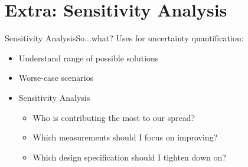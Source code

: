 \documentclass{beamer}
\newcommand{\expv}[1]{\ensuremath{\mathbb{E}[ #1]}}
\begin{document}
%

\section{Extra: Sensitivity Analysis}
\begin{frame}[label=sens_use]{Sensitivity Analysis}{So...what?}\vspace{-20pt}
Uses for uncertainty quantification:\vspace{5pt}
\begin{itemize}
\item Understand range of possible solutions
\item Worse-case scenarios
\item Sensitivity Analysis
  \begin{itemize}
  \item Who is contributing the most to our spread?
  \item Which measurements should I focus on improving?
  \item Which design specification should I tighten down on?
  \end{itemize}
\end{itemize}\vspace{-15pt}
\begin{center}\hyperlink{unc_sum}{}\end{center}
\end{frame}
\end{document}
